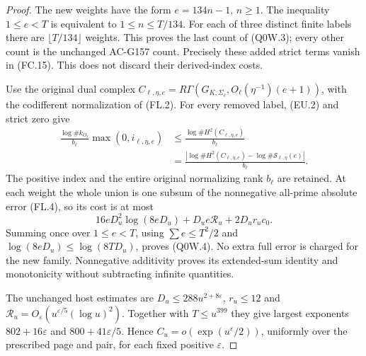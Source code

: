 \begin{proof}
The new weights have the form $e=134n-1$, $n\geq1$.
The inequality $1\leq e<T$ is equivalent to $1\leq n\leq T/134$.
For each of three distinct finite labels there are
$\lfloor T/134\rfloor$ weights.
This proves the last count of (Q0W.3); every other count is the
unchanged AC-G157 count.  Precisely these added strict terms
vanish in (FC.15).  This does not discard their derived-index costs.

Use the original dual complex
$C_{\ell,\eta,e}=R\Gamma(G_{K,\Sigma_\ell},
O_\ell(\eta^{-1})(e+1))$, with the codifferent normalization
of (FL.2).  For every removed label, (EU.2) and strict zero give
\[
 \begin{aligned}
 \frac{\log\#k_{O_\ell}}{b_\ell}\max(0,i_{\ell,\eta,e})
 &\leq\frac{\log\#H^2(C_{\ell,\eta,e})}{b_\ell}\\
 &=\frac{|\log\#H^2(C_{\ell,\eta,e})
                  -\log\#\mathcal S_{\ell,\eta}(e)|}{b_\ell}.
 \end{aligned}
 \tag{Q0W.6}
\]
The positive index and the entire original normalizing rank
$b_\ell$ are retained.  At each weight the whole union is one
subsum of the nonnegative all-prime absolute error (FL.4),
so its cost is at most
\[
                  16eD_u^2\log(8eD_u)+D_ue\mathcal R_u+2D_ur_uc_0.
 \tag{Q0W.7}
\]
Summing once over $1\leq e<T$, using $\sum e\leq T^2/2$
and $\log(8eD_u)\leq\log(8TD_u)$, proves (Q0W.4).
No extra full error is charged for the new family.
Nonnegative additivity proves its extended-sum identity and
monotonicity without subtracting infinite quantities.

The unchanged host estimates are $D_u\leq288u^{2+8\varepsilon}$,
$r_u\leq12$ and
$\mathcal R_u=O_\varepsilon(u^{\varepsilon/5}(\log u)^2)$.
Together with $T\leq u^{399}$ they give largest exponents
$802+16\varepsilon$ and $800+41\varepsilon/5$.
Hence $C_u=o(\exp(u^\varepsilon/2))$, uniformly over the
prescribed page and pair, for each fixed positive $\varepsilon$.


\end{proof}
